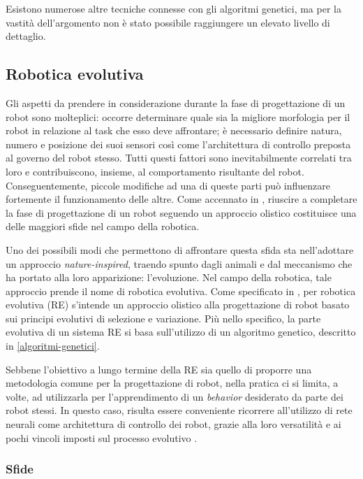 \documentclass[a4paper,12pt]{article}
\begin{document}
Esistono numerose altre tecniche connesse con gli algoritmi genetici, ma per la vastità dell'argomento non è stato possibile raggiungere un elevato livello di dettaglio.
\subsection*{Robotica evolutiva}

Gli aspetti da prendere in considerazione durante la fase di progettazione di un robot sono molteplici: occorre determinare quale sia la migliore morfologia per il robot in relazione al task che esso deve affrontare; è necessario definire natura, numero e posizione dei suoi sensori così come l'architettura di controllo preposta al governo del robot stesso. Tutti questi fattori sono inevitabilmente correlati tra loro e contribuiscono, insieme, al comportamento risultante del robot. Conseguentemente, piccole modifiche ad una di queste parti può influenzare fortemente il funzionamento delle altre. Come accennato in \cite{ERWWW}, riuscire a completare la fase di progettazione di un robot seguendo un approccio olistico costituisce una delle maggiori sfide nel campo della robotica.  

Uno dei possibili modi che permettono di affrontare questa sfida sta nell'adottare un approccio \emph{nature-inspired}, traendo spunto dagli animali e dal meccanismo che ha portato alla loro apparizione: l'evoluzione. Nel campo della robotica, tale approccio prende il nome di robotica evolutiva. Come specificato in \cite{ERNolfi}, per robotica evolutiva (RE) s'intende un approccio olistico alla progettazione di robot basato sui principi evolutivi di selezione e variazione. Più nello specifico, la parte evolutiva di un sistema RE si basa sull'utilizzo di un algoritmo genetico, descritto in \autoref{algoritmi-genetici}. 

Sebbene l'obiettivo a lungo termine della RE sia quello di proporre una metodologia comune per la progettazione di robot, nella pratica ci si limita, a volte, ad utilizzarla per l'apprendimento di un \emph{behavior} desiderato da parte dei robot stessi. In questo caso, risulta essere conveniente ricorrere all'utilizzo di rete neurali come architettura di controllo dei robot, grazie alla loro versatilità e ai pochi vincoli imposti sul processo evolutivo \cite{ERWWW}.

\subsubsection*{Sfide}
\end{document}
